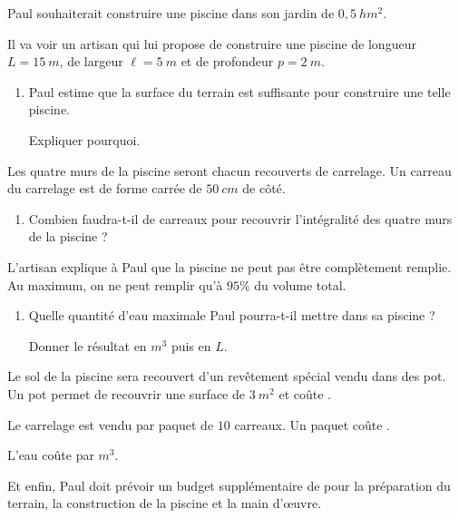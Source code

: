 \documentclass[12pt,french]{article}
\begin{document}
\begin{center}
\end{center}\bigskip
    
    Paul souhaiterait construire une piscine dans son jardin de $0,5~hm^2$.\par
    Il va voir un artisan qui lui propose de construire une piscine de longueur $L = 15~m$, de largeur $\ell = 5~m$ et de profondeur $p = 2~m$.
    
    \begin{enumerate}
        \item Paul estime que la surface du terrain est suffisante pour construire une telle piscine.\par Expliquer pourquoi.
    \end{enumerate}

    Les quatre murs de la piscine seront chacun recouverts de carrelage. Un carreau du carrelage est de forme carrée de $50~cm$ de côté.
    
    \begin{enumerate}[resume]
        \item Combien faudra-t-il de carreaux pour recouvrir l'intégralité des quatre murs de la piscine ?
    \end{enumerate}
    
    L'artisan explique à Paul que la piscine ne peut pas être complètement remplie. Au maximum, on ne peut remplir qu'à $95\%$ du volume total.
    
    \begin{enumerate}[resume]
        \item Quelle quantité d'eau maximale Paul pourra-t-il mettre dans sa piscine ? \par Donner le résultat en $m^3$ puis en $L$.
    \end{enumerate}
    
    Le sol de la piscine sera recouvert d'un revêtement spécial vendu dans des pot. Un pot permet de recouvrir une surface de $3~m^2$ et coûte .\par
    Le carrelage est vendu par paquet de $10$ carreaux. Un paquet coûte .\par
    L'eau coûte  par $m^3$.\par
    Et enfin, Paul doit prévoir un budget supplémentaire de  pour la préparation du terrain, la construction de la piscine et la main d'{\oe}uvre.
    
\end{document}
